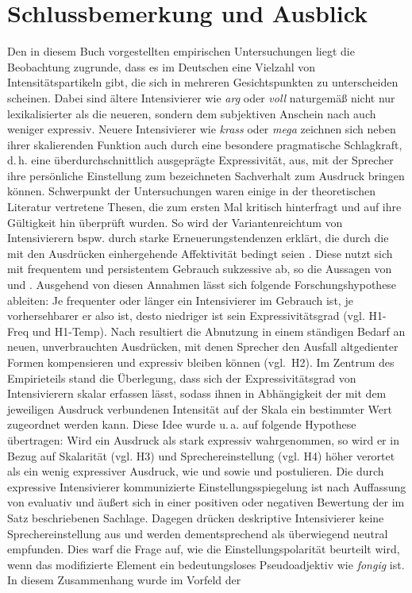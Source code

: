 
\chapter{{Schlussbemerkung und Ausblick}} \label{Gesamtfazit}
Den in diesem Buch vorgestellten empirischen Untersuchungen liegt die Beobachtung zugrunde, dass es im Deutschen eine Vielzahl von Intensitätspartikeln gibt, die sich in mehreren Gesichtspunkten zu unterscheiden scheinen. Dabei sind ältere Intensivierer wie \textit{arg} oder \textit{voll} naturgemäß nicht nur lexikalisierter als die neueren, sondern dem subjektiven Anschein nach auch weniger expressiv. Neuere Intensivierer wie \textit{krass} oder \textit{mega} zeichnen sich neben ihrer skalierenden Funktion auch durch eine besondere pragmatische Schlagkraft, d.\,h. eine überdurchschnittlich ausgeprägte Expressivität, aus, mit der Sprecher ihre persönliche Einstellung zum bezeichneten Sachverhalt zum Ausdruck bringen können. Schwerpunkt der Untersuchungen waren einige in der theoretischen Literatur vertretene Thesen, die zum ersten Mal kritisch hinterfragt und auf ihre Gültigkeit hin überprüft wurden. So wird der Variantenreichtum von Intensivierern bspw. durch starke Erneuerungstendenzen erklärt, die durch die mit den Ausdrücken einhergehende Affektivität bedingt seien \mbox{\citep[vgl.][650]{Bussmann.2002}}. Diese nutzt sich mit frequentem und persistentem Gebrauch sukzessive ab, so die Aussagen von \mbox{\citet[2]{Hauschild.1899}} und \mbox{\citet[59]{Tobler.1868}}. Ausgehend von diesen Annahmen lässt sich folgende Forschungshypothese ableiten: Je frequenter oder länger ein Intensivierer im Gebrauch ist, je vorhersehbarer er also ist, desto niedriger ist sein Expressivitätsgrad (vgl. H1-Freq und \mbox{H1-Temp}). Nach \mbox{\citet[274]{Baumgarten.1908}} resultiert die Abnutzung in einem ständigen Bedarf an neuen, unverbrauchten Ausdrücken, mit denen Sprecher den Ausfall altgedienter Formen kompensieren und expressiv bleiben können (\mbox{vgl. H2}). Im Zentrum des Empirieteils stand die Überlegung, dass sich der Expressivitätsgrad von Intensivierern skalar erfassen lässt, sodass ihnen in Abhängigkeit der mit dem jeweiligen Ausdruck verbundenen Intensität auf der Skala ein bestimmter Wert zugeordnet werden kann. Diese Idee wurde u.\,a. auf folgende Hypothese übertragen: Wird ein Ausdruck als stark expressiv wahrgenommen, so wird er in Bezug auf Skalarität (vgl. H3) und Sprechereinstellung (vgl. H4) höher verortet als ein wenig expressiver Ausdruck, wie \citet[22]{Paradis.1997} und \mbox{\citet[133]{Gutzmann.2019a}} sowie \mbox{\citet[315]{Lang.1983}} und \mbox{\citet[57]{Ortner.2014}} postulieren. Die durch expressive Intensivierer kommunizierte Einstellungsspiegelung ist nach Auffassung von \citet[135]{Gutzmann.2019a} evaluativ und äußert sich in einer positiven oder negativen Bewertung der im Satz beschriebenen Sachlage. Dagegen drücken deskriptive Intensivierer keine Sprechereinstellung aus und werden dementsprechend als überwiegend neutral empfunden. Dies warf die Frage auf, wie die Einstellungspolarität beurteilt wird, wenn das modifizierte Element ein bedeutungsloses Pseudoadjektiv wie \textit{fongig} ist. In diesem Zusammenhang wurde im Vorfeld der 